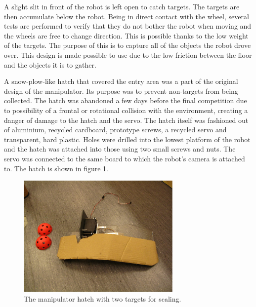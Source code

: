 \documentclass[a4paper,10pt]{article}
\begin{document}
A slight slit in front of the robot is left open to catch targets. The targets are then accumulate below the robot. Being in direct contact with the wheel, several tests are performed to verify that they do not bother the robot when moving and the wheels are free to change direction. This is possible thanks to the low weight of the targets. The purpose of this is to capture all of the objects the robot drove over. This design is made possible to use due to the low friction between the floor and the objects it is to gather.

A snow-plow-like hatch that covered the entry area was a part of the original design of the manipulator. Its purpose was to prevent non-targets from being collected. The hatch was abandoned a few days before the final competition due to possibility of a frontal or rotational collision with the environment, creating a danger of damage to the hatch and the servo. The hatch itself was fashioned out of aluminium, recycled cardboard, prototype screws, a recycled servo and transparent, hard plastic. Holes were drilled into the lowest platform of the robot and the hatch was attached into those using two small screws and nuts. The servo was connected to the same board to which the robot's camera is attached to. The hatch is shown in figure \ref{hatch}.

\begin{figure}[h]	%
\begin{center}
\includegraphics[width=8.0cm]{hatch.eps}
\caption{The manipulator hatch with two targets for scaling.}
\label{hatch} %
\end{center}
\end{figure}
\end{document}
